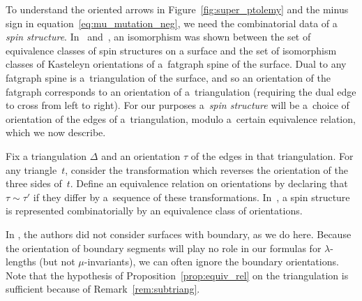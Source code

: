 \documentclass[11pt]{article}
\numberwithin{equation}{section}
\numberwithin{equation}{section}
\begin{document}
To understand the oriented arrows in Figure~\ref{fig:super_ptolemy} and the minus sign in equation~\eqref{eq:mu_mutation_neg},
we need the combinatorial data of a \emph{spin structure}. In~\cite{cr_07} and~\cite{cr_08}, an isomorphism was shown between
the set of equivalence classes of spin structures on a surface and the set of isomorphism classes of Kasteleyn orientations
of a~fatgraph spine of the surface. Dual to any fatgraph spine is a~triangulation of the surface, and so an orientation of
the fatgraph corresponds to an orientation of a~triangulation (requiring the dual edge to cross from left to right). For our
purposes a~\emph{spin structure} will be a~choice of orientation of the edges of a~triangulation, modulo a~certain equivalence relation,
which we now describe.

Fix a triangulation $\Delta$ and an orientation $\tau$ of the edges in that triangulation. For any triangle~$t$,
consider the transformation which reverses the orientation of the three sides of~$t$. Define an equivalence relation on orientations by declaring that $\tau \sim \tau'$ if they differ by a~sequence of these transformations. In~\cite{pz_19}, a spin
structure is represented combinatorially by an equivalence class of orientations.

In \cite{pz_19}, the authors did not consider surfaces with boundary, as we do here. Because the orientation of boundary segments
will play no role in our formulas for $\lambda$-lengths (but not $\mu$-invariants), we can often ignore the boundary orientations.
Note that the hypothesis of Proposition~\ref{prop:equiv_rel} on the triangulation is sufficient because of Remark~\ref{rem:subtriang}.
\end{document}
